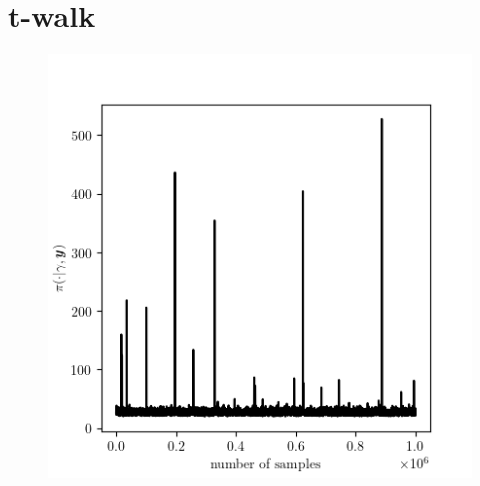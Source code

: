 \section{t-walk}

\begin{figure}[ht!]
	\centering
	\includegraphics{TraceTwalk.png}
	\caption[]{}
	\label{fig:TraceTwalk}
\end{figure}
